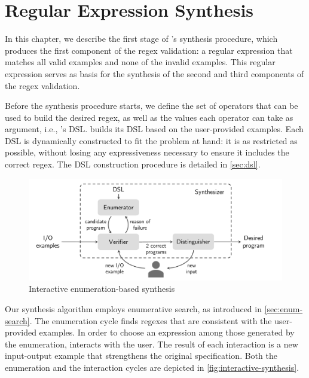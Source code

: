 \chapter{Regular Expression Synthesis}\label{chap:regex-synthesis}

In this chapter, we describe the first stage of \Forest{}'s synthesis procedure, which produces the first component of the regex validation: a regular expression that matches all valid examples and none of the invalid examples. This regular expression serves as basis for the synthesis of the second and third components of the regex validation.


Before the synthesis procedure starts, we define the set of operators that can be used to build the desired regex, as well as the values each operator can take as argument, i.e., \Forest{}'s \ac{DSL}. \Forest{} builds its \ac{DSL} based on the user-provided examples. Each \ac{DSL} is dynamically constructed to fit the problem at hand: it is as restricted as possible, without losing any expressiveness necessary to ensure it includes the correct regex. The \ac{DSL} construction procedure is detailed in \autoref{sec:dsl}.

\begin{figure}[t]
    \centering
    \includegraphics[scale=.35]{pictures/interactive_synthesis.pdf}
    \caption{Interactive enumeration-based synthesis}
    \label{fig:interactive-synthesis}
\end{figure}

Our synthesis algorithm employs enumerative search, as introduced in \autoref{sec:enum-search}. The enumeration cycle finds regexes that are consistent with the user-provided examples. In order to choose an expression among those generated by the enumeration,  \Forest{} interacts with the user. The result of each interaction is a new input-output example that strengthens the original specification. Both the enumeration and the interaction cycles are depicted in \autoref{fig:interactive-synthesis}.

